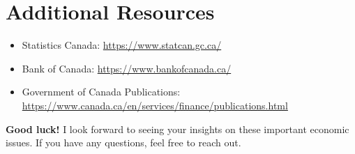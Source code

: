 \documentclass[12pt]{article}
\begin{document}
\section*{Additional Resources}
\begin{itemize}
    \item Statistics Canada: \url{https://www.statcan.gc.ca/}
    \item Bank of Canada: \url{https://www.bankofcanada.ca/}
    \item Government of Canada Publications: \url{https://www.canada.ca/en/services/finance/publications.html}
\end{itemize}

\vspace{2cm}
\centering
\textbf{Good luck!} I look forward to seeing your insights on these important economic issues. If you have any questions, feel free to reach out.
\end{document}
